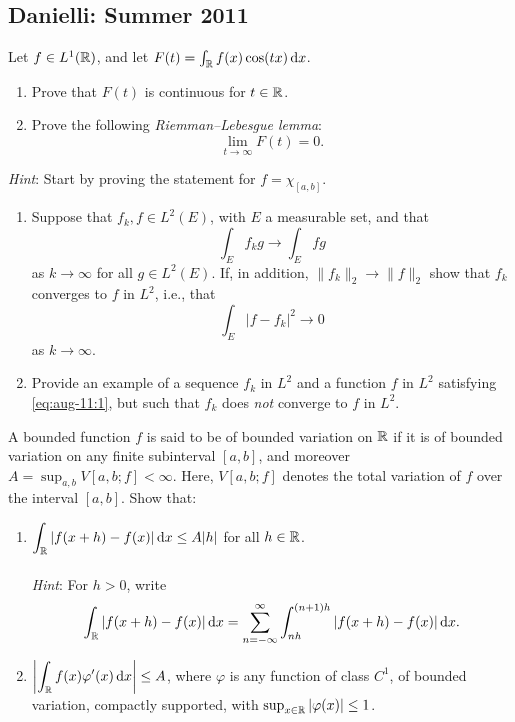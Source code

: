 \subsection{Danielli: Summer 2011}
\setcounter{exercise}{0}

\begin{problem}
Let $f\in L^1(\mathbb{R})$, and let $F(t)=\int_{\mathbb{R}} f(x)\cos(tx)\mathop{}\!\mathrm{d} x$.
\begin{enumerate}[label=(\alph*),noitemsep]
\item Prove that $F(t)$ is continuous for $t\in\mathbb{R}$.
\item Prove the following \emph{Riemman--Lebesgue lemma}:
\[
\lim_{t\to\infty}F(t)=0.
\]
\end{enumerate}
\emph{Hint}: Start by proving the statement for $f=\chi_{[a,b]}$.
\end{problem}
\begin{solution}
\end{solution}

\begin{problem}
\begin{enumerate}[label=(\alph*),noitemsep]
\item Suppose that $f_k,f\in L^2(E)$, with $E$ a measurable set, and that
\begin{equation}
\label{eq:aug-11:1}
\int_E f_kg\longrightarrow\int_E fg
\end{equation}
as $k\to\infty$ for all $g\in L^2(E)$. If, in addition,
$\|f_k\|_2\to\|f\|_2$ show that $f_k$ converges to $f$ in $L^2$, i.e., that
\[
\int_E|f-f_k|^2\longrightarrow 0
\]
as $k\to\infty$.
\item Provide an example of a sequence $f_k$ in $L^2$ and a function $f$ in
  $L^2$ satisfying \eqref{eq:aug-11:1}, but such that $f_k$ does \emph{not}
  converge to $f$ in $L^2$.
\end{enumerate}
\end{problem}
\begin{solution}
\end{solution}

\begin{problem}
A bounded function $f$ is said to be of bounded variation on $\mathbb{R}$ if it
is of bounded variation on any finite subinterval $[a,b]$, and moreover
$A=\sup_{a,b}V[a,b;f]<\infty$. Here, $V[a,b;f]$ denotes the total
variation of $f$ over the interval $[a,b]$. Show that:
\begin{enumerate}[label=(\alph*),noitemsep]
\item $\displaystyle\int_{\mathbb{R}}|f(x+h)-f(x)|\mathop{}\!\mathrm{d} x\leq A|h|$ for all
  $h\in\mathbb{R}$.
\\\\
\emph{Hint}: For $h>0$, write
\[
\int_{\mathbb{R}} |f(x+h)-f(x)|\mathop{}\!\mathrm{d} x=
\sum_{n=-\infty}^\infty\int_{nh}^{(n+1)h}|f(x+h)-f(x)|\mathop{}\!\mathrm{d} x.
\]
\item $\displaystyle\left|\int_{\mathbb{R}} f(x)\varphi'(x)\mathop{}\!\mathrm{d} x\right|\leq A$,
  where $\varphi$ is any function of class $C^1$, of bounded variation,
  compactly supported, with $\sup_{x\in\mathbb{R}}|\varphi(x)|\leq 1$.
\end{enumerate}
\end{problem}
\begin{solution}
\end{solution}

